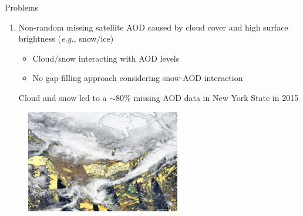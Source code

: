 \documentclass[handout]{beamer} %
\begin{document}
\begin{frame}{Problems}
    \begin{enumerate}
        \item<1> Non-random missing satellite AOD caused by cloud cover and high surface brightness (\textit{e.g.,} snow/ice) 
            \begin{itemize}
                \item \textcolor[rgb]{1,0.4,0}{Cloud/snow interacting with AOD levels}
                \item \textcolor[rgb]{1,0.4,0}{No gap-filling approach considering snow-AOD interaction}
            \end{itemize}
        \textcolor[rgb]{0.1,0.1,0.6}{Cloud and snow led to a $\sim$80\% missing AOD data in New York State in 2015}
    \end{enumerate}
    \vspace{-0.1cm}
    \begin{figure}
        \centering
        \includegraphics[width=0.6\textwidth]{img/missing.jpg}
    \end{figure}
\end{frame}
\end{document}

